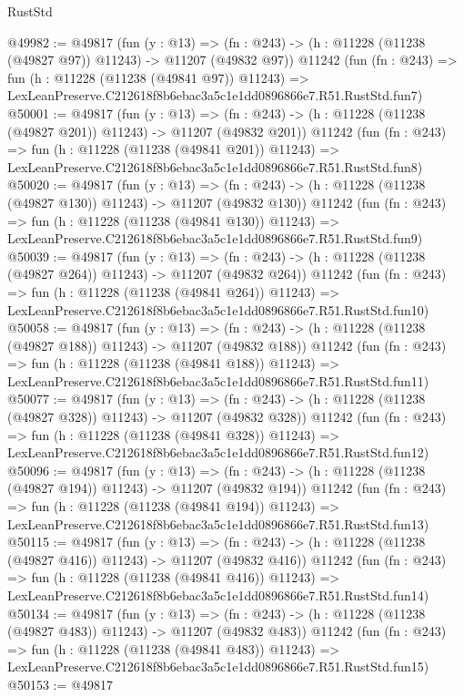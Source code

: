 \begin{lexlean}{RustStd}
\begin{coremodule}
@49982 := @49817
    (fun (y : @13) =>
    (fn : @243) -> (h : @11228 (@11238 (@49827 @97)) @11243) -> @11207 (@49832 @97))
    @11242
    (fun (fn : @243) =>
    fun (h : @11228 (@11238 (@49841 @97)) @11243) =>
    LexLeanPreserve.C212618f8b6ebac3a5c1e1dd0896866e7.R51.RustStd.fun7)
@50001 := @49817
    (fun (y : @13) =>
    (fn : @243) -> (h : @11228 (@11238 (@49827 @201)) @11243) -> @11207 (@49832 @201))
    @11242
    (fun (fn : @243) =>
    fun (h : @11228 (@11238 (@49841 @201)) @11243) =>
    LexLeanPreserve.C212618f8b6ebac3a5c1e1dd0896866e7.R51.RustStd.fun8)
@50020 := @49817
    (fun (y : @13) =>
    (fn : @243) -> (h : @11228 (@11238 (@49827 @130)) @11243) -> @11207 (@49832 @130))
    @11242
    (fun (fn : @243) =>
    fun (h : @11228 (@11238 (@49841 @130)) @11243) =>
    LexLeanPreserve.C212618f8b6ebac3a5c1e1dd0896866e7.R51.RustStd.fun9)
@50039 := @49817
    (fun (y : @13) =>
    (fn : @243) -> (h : @11228 (@11238 (@49827 @264)) @11243) -> @11207 (@49832 @264))
    @11242
    (fun (fn : @243) =>
    fun (h : @11228 (@11238 (@49841 @264)) @11243) =>
    LexLeanPreserve.C212618f8b6ebac3a5c1e1dd0896866e7.R51.RustStd.fun10)
@50058 := @49817
    (fun (y : @13) =>
    (fn : @243) -> (h : @11228 (@11238 (@49827 @188)) @11243) -> @11207 (@49832 @188))
    @11242
    (fun (fn : @243) =>
    fun (h : @11228 (@11238 (@49841 @188)) @11243) =>
    LexLeanPreserve.C212618f8b6ebac3a5c1e1dd0896866e7.R51.RustStd.fun11)
@50077 := @49817
    (fun (y : @13) =>
    (fn : @243) -> (h : @11228 (@11238 (@49827 @328)) @11243) -> @11207 (@49832 @328))
    @11242
    (fun (fn : @243) =>
    fun (h : @11228 (@11238 (@49841 @328)) @11243) =>
    LexLeanPreserve.C212618f8b6ebac3a5c1e1dd0896866e7.R51.RustStd.fun12)
@50096 := @49817
    (fun (y : @13) =>
    (fn : @243) -> (h : @11228 (@11238 (@49827 @194)) @11243) -> @11207 (@49832 @194))
    @11242
    (fun (fn : @243) =>
    fun (h : @11228 (@11238 (@49841 @194)) @11243) =>
    LexLeanPreserve.C212618f8b6ebac3a5c1e1dd0896866e7.R51.RustStd.fun13)
@50115 := @49817
    (fun (y : @13) =>
    (fn : @243) -> (h : @11228 (@11238 (@49827 @416)) @11243) -> @11207 (@49832 @416))
    @11242
    (fun (fn : @243) =>
    fun (h : @11228 (@11238 (@49841 @416)) @11243) =>
    LexLeanPreserve.C212618f8b6ebac3a5c1e1dd0896866e7.R51.RustStd.fun14)
@50134 := @49817
    (fun (y : @13) =>
    (fn : @243) -> (h : @11228 (@11238 (@49827 @483)) @11243) -> @11207 (@49832 @483))
    @11242
    (fun (fn : @243) =>
    fun (h : @11228 (@11238 (@49841 @483)) @11243) =>
    LexLeanPreserve.C212618f8b6ebac3a5c1e1dd0896866e7.R51.RustStd.fun15)
@50153 := @49817

\end{coremodule}
\end{lexlean}
